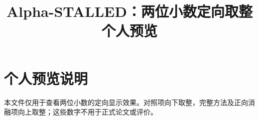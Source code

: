 \documentclass[conference]{IEEEtran}
\newcommand{\method}{Alpha-STALLED}
\begin{document}
\section*{个人预览说明}
本文件仅用于查看两位小数的定向显示效果。对照项向下取整，完整方法及正向消融项向上取整；这些数字不用于正式论文或评价。


\title{\method：两位小数定向取整个人预览}

\author{
}

\maketitle











\balance


\end{document}
